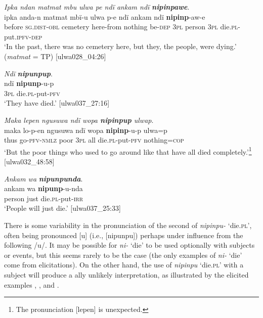 \ea%
    \label{ex:verbs:10}

          \textit{Ipka ndan matmat mbu ulwa pe ndï ankam ndï} \textbf{\textit{nipinpawe}}.\\
          \gll ipka  anda-n      matmat  mbï-u    ulwa    p-e ndï ankam  ndï  \textbf{nipinp}{}-aw-e\\
    before  \textsc{sg.dist}{}-\textsc{obl}  cemetery  here-from  nothing  be\textsc{{}-dep} 3\textsc{pl}  person  3\textsc{pl}  die.\textsc{pl}{}-put.\textsc{ipfv-dep}\\

\glt `In the past, there was no cemetery here, but they, the people, were dying.’ (\textit{matmat} = TP) [ulwa028\_04:26]
\z

\ea%
    \label{ex:verbs:11}
          \textit{Ndï} \textbf{\textit{nipunpup}}.\\
\gll ndï  \textbf{nipunp}{}-u-p\\
    3\textsc{pl}  die.\textsc{pl}{}-put-\textsc{pfv}\\
\glt `They have died.’ [ulwa037\_27:16]
\z

\ea%
    \label{ex:verbs:12}
          \textit{Maka lepen ngusuwa ndï wopa \textbf{nipinpup} ulwap}.\\
\gll maka  lo{}-p-en      ngusuwa  ndï  wopa  \textbf{nipinp}{}-u-p ulwa=p\\
    thus  go-\textsc{pfv}{}-\textsc{nmlz}  poor    3\textsc{pl}  all    die.\textsc{pl}{}-put-\textsc{pfv} nothing=\textsc{cop}\\

\glt `But the poor things who used to go around like that have all died completely.’\footnote{The pronunciation [lepen] is unexpected.} [ulwa032\_48:58]
\z

\ea%
    \label{ex:verbs:13}
          \textit{Ankam wa} \textbf{\textit{nipunpunda}}.\\
\gll ankam  wa  \textbf{nipunp}{}-u-nda\\
    person  just  die.\textsc{pl}{}-put-\textsc{irr}\\
\glt `People will just die.’ [ulwa037\_25:33]
\z

There is some variability in the pronunciation of the second  of \textit{nipinpu{}-} ‘die.\textsc{pl}’, often being pronounced [u] (i.e., [nipunpu]) perhaps under influence from the following /u/. It may be possible for \textit{ni-} ‘die’ to be used optionally with  subjects or events, but this seems rarely to be the case (the only examples of  \textit{ni-} ‘die’ come from elicitations). On the other hand, the use of \textit{nipinpu} ‘die.\textsc{pl}’ with a  subject will produce a ally unlikely interpretation, as illustrated by the elicited examples , , and .

